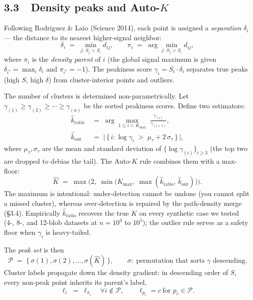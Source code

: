 \subsection*{3.3~~Density peaks and Auto-$K$}

Following Rodriguez \& Laio (Science 2014), each point is assigned a
\emph{separation} $\delta_i$ — the distance to its nearest higher-signal
neighbor:
\begin{equation}
\label{eq:delta}
\delta_i \;=\; \min_{j:\, S_j > S_i} d_{ij},
\qquad
\pi_i \;=\; \arg\!\min_{j:\, S_j > S_i} d_{ij},
\end{equation}
where $\pi_i$ is the \emph{density parent} of $i$ (the global signal
maximum is given $\delta_{i^\star} = \max_i \delta_i$ and $\pi_{i^\star} = -1$).
The peakiness score $\gamma_i = S_i \cdot \delta_i$ separates true peaks
(high $S$, high $\delta$) from cluster-interior points and outliers.

The number of clusters is determined non-parametrically. Let
$\gamma_{(1)} \ge \gamma_{(2)} \ge \cdots \ge \gamma_{(n)}$ be the sorted
peakiness scores. Define two estimators:
\begin{align}
\label{eq:k_ratio}
\hat k_{\text{ratio}} \;&=\; \arg\max_{1 \le i < K_{\max}} \;\frac{\gamma_{(i)}}{\gamma_{(i+1)}}, \\[4pt]
\label{eq:k_outlier}
\hat k_{\text{out}} \;&=\; \bigl|\,\{\,i : \log \gamma_i \;>\; \mu_{\tau} + 2\,\sigma_{\tau}\,\}\,\bigr|,
\end{align}
where $\mu_{\tau}, \sigma_{\tau}$ are the mean and standard deviation of
$\{\log \gamma_{(i)}\}_{i \ge 3}$ (the top two are dropped to debias the
tail). The Auto-$K$ rule combines them with a max-floor:
\begin{equation}
\label{eq:auto_k}
\hat K \;=\; \max\!\bigl(2,\; \min\!\bigl(K_{\max},\; \max(\hat k_{\text{ratio}},\, \hat k_{\text{out}})\bigr)\bigr).
\end{equation}
The maximum is intentional: under-detection cannot be undone (you cannot
split a missed cluster), whereas over-detection is repaired by the
path-density merge (\S 3.4). Empirically $\hat k_{\text{ratio}}$ recovers
the true $K$ on every synthetic case we tested (4-, 8-, and 12-blob
datasets at $n = 10^3$ to $10^5$); the outlier rule serves as a safety
floor when $\gamma_i$ is heavy-tailed.

The \emph{peak set} is then
\begin{equation}
\label{eq:peak_set}
\mathcal{P} \;=\; \{\,\sigma(1), \sigma(2), \dots, \sigma(\hat K)\,\},
\qquad \sigma:\; \text{permutation that sorts $\gamma$ descending}.
\end{equation}
Cluster labels propagate down the density gradient: in descending order
of $S$, every non-peak point inherits its parent's label,
\[
\ell_i \;=\; \ell_{\pi_i} \quad \forall i \notin \mathcal{P}, \qquad \ell_{p_c} = c \ \text{for } p_c \in \mathcal{P}.
\]

